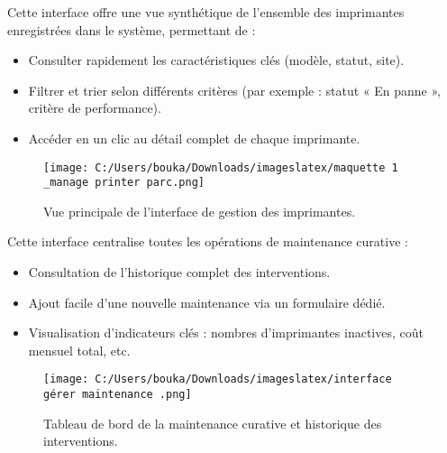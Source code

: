\documentclass[a4paper,11pt]{report}
\begin{document}
\begin{tcolorbox}[
  enhanced,
  colback=blue!5,
  colframe=blue!75!black,
  boxrule=1pt,
  arc=4pt,
  title=\large\bfseries Interface : Gestion d’imprimantes
]
\vspace{-1ex}
\noindent
Cette interface offre une vue synthétique de l’ensemble des imprimantes enregistrées dans le système, permettant de :
\begin{itemize}[label=\raisebox{0.2ex}{\tiny\textbullet}, left=1em]
  \item Consulter rapidement les caractéristiques clés (modèle, statut, site).
  \item Filtrer et trier selon différents critères (par exemple : statut « En panne », critère de performance).
  \item Accéder en un clic au détail complet de chaque imprimante.
\end{itemize}

\begin{figure}[H]
  \centering
  \texttt{[image: C:/Users/bouka/Downloads/imageslatex/maquette 1 \_manage printer parc.png]}
  \caption{Vue principale de l’interface de gestion des imprimantes.}
  \label{fig:gestion-imprimantes}
\end{figure}
\end{tcolorbox}


\vspace{2ex}

\begin{tcolorbox}[
  enhanced,
  colback=blue!5,
  colframe=blue!75!black,
  boxrule=1pt,
  arc=4pt,
  title=\large\bfseries Interface : Maintenance curative et Historique
]
\vspace{-1ex}
\noindent
Cette interface centralise toutes les opérations de maintenance curative :
\begin{itemize}[label=\raisebox{0.2ex}{\tiny\textbullet}, left=1em]
  \item Consultation de l’historique complet des interventions.
  \item Ajout facile d’une nouvelle maintenance via un formulaire dédié.
  \item Visualisation d’indicateurs clés : nombres d’imprimantes inactives, coût mensuel total, etc.
\end{itemize}

\begin{figure}[H]
  \centering
  \texttt{[image: C:/Users/bouka/Downloads/imageslatex/interface gérer maintenance .png]}
  \caption{Tableau de bord de la maintenance curative et historique des interventions.}
  \label{fig:maintenance-curative}
\end{figure}
\end{tcolorbox}
\end{document}
